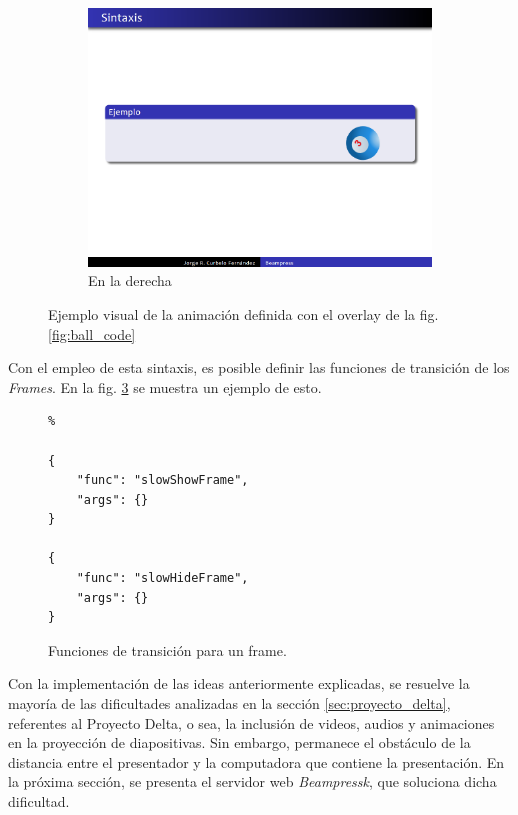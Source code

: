 \begin{figure}[tb]
\begin{subfigure}[b]{0.3\textwidth}
 				\includegraphics[width=\textwidth]{img/ball-right}
 				\caption{En la derecha}
 				\label{fig:ball_visual_c}	
 			\end{subfigure}	  			
 			\caption{Ejemplo visual de la animación definida con el overlay de la fig. \ref{fig:ball_code}}
 			\label{fig:ball_visual} 
 		\end{figure}	


	Con el empleo de esta sintaxis, es posible definir las funciones de transición de los \textit{Frames}. En la fig. \ref{fig:frame_trans} se muestra un ejemplo de esto.

		\begin{figure}[htb]%
			\begin{lstlisting}%

{
    "func": "slowShowFrame",
    "args": {}
}

{
    "func": "slowHideFrame",
    "args": {}
}
			\end{lstlisting}
		\caption{
			Funciones de transición para un frame. 
			\label{fig:frame_trans} }
		\end{figure}	

	

		Con la implementación de las ideas anteriormente explicadas, se resuelve la mayoría de las dificultades analizadas en la sección \ref{sec:proyecto_delta}, referentes al Proyecto Delta, o sea, la inclusión de videos, audios y animaciones en la proyección de diapositivas. Sin embargo, permanece el obstáculo de la distancia entre el presentador y la computadora que contiene la presentación. En la próxima sección, se presenta el servidor web \textit{Beampressk}, que soluciona dicha dificultad.

